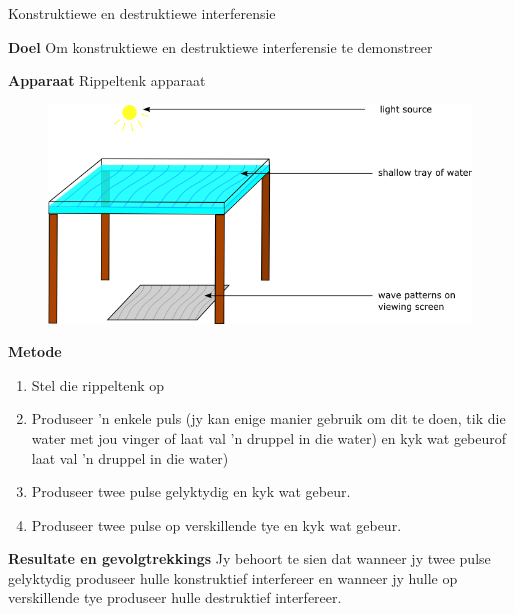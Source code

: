 	
\par
\label{m38802*eip-791}
\begin{g_experiment}{Konstruktiewe en destruktiewe interferensie}

\textbf{Doel}
Om konstruktiewe en destruktiewe interferensie te demonstreer
\par 
\label{m38802*eip7241}\noindent{}\textbf{Apparaat} 
Rippeltenk apparaat
	
\begin{figure}[H] %
    \begin{center}
    \label{m38802*id63458!!!underscore!!!media}\label{m38802*id63458!!!underscore!!!printimage}\includegraphics[width=0.8\columnwidth]{col11305.imgs/m38802_rippletray.png} %
      \vspace{2pt}
    \vspace{.1in}
    \end{center}
 \end{figure}       \par 
\textbf{Metode}
\begin{enumerate}[noitemsep, label=\textbf{\arabic*}. ] 
    \item Stel die rippeltenk op
    \item Produseer 'n enkele puls (jy kan enige manier gebruik om dit te doen, tik die water met jou vinger of laat val 'n druppel in die water) en kyk wat gebeurof laat val 'n druppel in die water)
    \item Produseer twee pulse gelyktydig en kyk wat gebeur.
    \item Produseer twee pulse op verskillende tye en kyk wat gebeur.
\end{enumerate}    
\par 
\textbf{Resultate en gevolgtrekkings}
Jy behoort te sien dat wanneer jy twee pulse gelyktydig produseer hulle konstruktief interfereer en wanneer jy hulle op verskillende tye produseer hulle destruktief interfereer.
\par 
\end{g_experiment}


